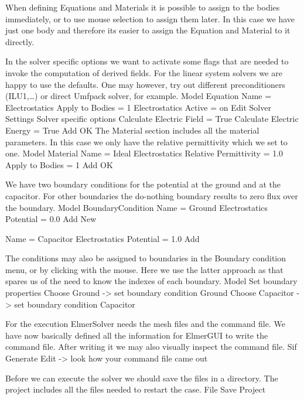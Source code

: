 When defining Equations and Materials it is possible to assign to the bodies immediately, or to use mouse
selection to assign them later. In this case we have just one body and therefore its easier to assign 
the Equation and Material to it directly.

In the solver specific options we want to activate some flags that are needed to invoke the 
computation of derived fields. 
For the linear system solvers we are happy to use the defaults. One may however, try out different
preconditioners (ILU1,\ldots) or direct Umfpack solver, for example.
\ttbegin
Model
  Equation
    Name = Electrostatics
    Apply to Bodies = 1
    Electrostatics
      Active = on
      Edit Solver Settings
        Solver specific options
          Calculate Electric Field = True
          Calculate Electric Energy = True
    Add 
    OK
\ttend        
The Material section includes all the material parameters.
In this case we only have the relative permittivity which we set to one.
\ttbegin
Model
  Material
    Name = Ideal
    Electrostatics
      Relative Permittivity = 1.0
    Apply to Bodies = 1 
    Add
    OK
\ttend

We have two boundary conditions for the potential at the ground and at the capacitor. For other boundaries
the do-nothing boundary results to zero flux over the boundary.
\ttbegin
Model
  BoundaryCondition
    Name = Ground
    Electrostatics
      Potential = 0.0
    Add
    New

    Name = Capacitor
    Electrostatics
      Potential = 1.0
    Add
\ttend   

The conditions may also be assigned to boundaries in the Boundary condition menu, or 
by clicking with the mouse. Here we use the latter approach as that spares us of the 
need to know the indexes of each boundary.
\ttbegin
Model
  Set boundary properties
    Choose Ground -> set boundary condition Ground
    Choose Capacitor -> set boundary condition Capacitor
\ttend


For the execution 
ElmerSolver needs the mesh files and the command file. We have now basically defined
all the information for ElmerGUI to write the command file. After writing it we may also visually 
inspect the command file.
\ttbegin
Sif 
  Generate
  Edit -> look how your command file came out  
\ttend

Before we can execute the solver we should save the files in a directory. The project includes
all the files needed to restart the case.
\ttbegin
File 
  Save Project
\ttend

